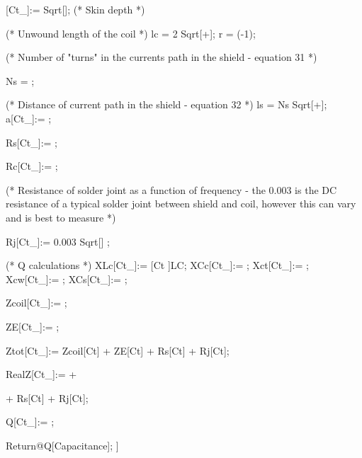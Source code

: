 \begin{mmaCell}
  \mmaLoc{\(\delta\)}[Ct_]:= Sqrt[]; (* Skin depth *)
  
  (* Unwound length of the coil *)
  lc = 2\mmaDef{\(\pi\)} Sqrt[+];
  r = (-1);
  
  (* Number of "turns" in the currents path in the shield 
  - equation 31 *)
  
  Ns = ;
  
  (* Distance of current path in the shield - equation 32 *)
  ls = Ns Sqrt[+];
  a[Ct_]:= ;
  
  Rs[Ct_]:= ;
  
  Rc[Ct_]:= ;
  
  (* Resistance of solder joint as a function of frequency - 
  the 0.003 is the DC resistance of a typical solder joint 
  between shield and coil, however this can vary 
  and is best to measure *)
  
  Rj[Ct_]:= 0.003 Sqrt[] \mmaDef{\(\Omega\)};
  
  (* Q calculations *)
  XLc[Ct_]:= [Ct ]LC;
  XCc[Ct_]:= ;
  Xct[Ct_]:= ;
  Xcw[Ct_]:= ;
  XCs[Ct_]:= ;
  
  Zcoil[Ct_]:= ;
  
  ZE[Ct_]:= ;
  
  Ztot[Ct_]:= Zcoil[Ct] + ZE[Ct] + Rs[Ct] + Rj[Ct];
  
  RealZ[Ct_]:=  +
  
  
  + Rs[Ct] + Rj[Ct];
  
  Q[Ct_]:= ;
  
  Return@Q[Capacitance];
]
\end{mmaCell}

